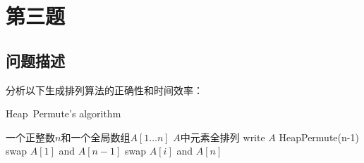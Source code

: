 \documentclass[cs4size, punct, nospace, fancyhdr, fntef, UTF8]{ctexart}
\begin{document}
  \section{第三题}
  \subsection{问题描述}
  分析以下生成排列算法的正确性和时间效率：

  \begin{algorithm}
    \caption{Heap\ Permute's algorithm}\label{alg:HeapPermute}
  \begin{algorithmic}[1]
      \Require 一个正整数$n$和一个全局数组$A\left[1 \dots n\right]$
      \Ensure $A$中元素全排列
        \State write $A$
      \Else
          \State HeapPermute(n-1)
            \State swap $A[1]$ and $A[n-1]$
          \Else
            \State swap $A[i]$ and $A[n]$
          \EndIf
        \EndFor
      \EndIf
    \EndFunction
    \end{algorithmic}
    \end{algorithm}
\end{document}
